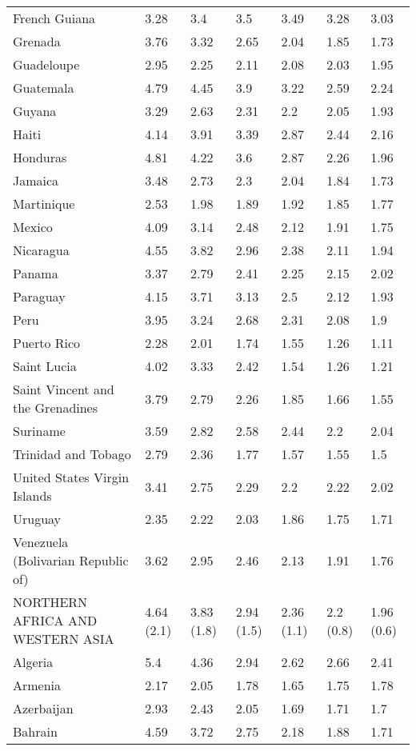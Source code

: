 \begin{longtable}[t]{lllllll}
French Guiana & 3.28 & 3.4 & 3.5 & 3.49 & 3.28 & 3.03\\
Grenada & 3.76 & 3.32 & 2.65 & 2.04 & 1.85 & 1.73\\
Guadeloupe & 2.95 & 2.25 & 2.11 & 2.08 & 2.03 & 1.95\\
Guatemala & 4.79 & 4.45 & 3.9 & 3.22 & 2.59 & 2.24\\
Guyana & 3.29 & 2.63 & 2.31 & 2.2 & 2.05 & 1.93\\
Haiti & 4.14 & 3.91 & 3.39 & 2.87 & 2.44 & 2.16\\
Honduras & 4.81 & 4.22 & 3.6 & 2.87 & 2.26 & 1.96\\
Jamaica & 3.48 & 2.73 & 2.3 & 2.04 & 1.84 & 1.73\\
Martinique & 2.53 & 1.98 & 1.89 & 1.92 & 1.85 & 1.77\\
Mexico & 4.09 & 3.14 & 2.48 & 2.12 & 1.91 & 1.75\\
Nicaragua & 4.55 & 3.82 & 2.96 & 2.38 & 2.11 & 1.94\\
Panama & 3.37 & 2.79 & 2.41 & 2.25 & 2.15 & 2.02\\
Paraguay & 4.15 & 3.71 & 3.13 & 2.5 & 2.12 & 1.93\\
Peru & 3.95 & 3.24 & 2.68 & 2.31 & 2.08 & 1.9\\
Puerto Rico & 2.28 & 2.01 & 1.74 & 1.55 & 1.26 & 1.11\\
Saint Lucia & 4.02 & 3.33 & 2.42 & 1.54 & 1.26 & 1.21\\
Saint Vincent and the Grenadines & 3.79 & 2.79 & 2.26 & 1.85 & 1.66 & 1.55\\
Suriname & 3.59 & 2.82 & 2.58 & 2.44 & 2.2 & 2.04\\
Trinidad and Tobago & 2.79 & 2.36 & 1.77 & 1.57 & 1.55 & 1.5\\
United States Virgin Islands & 3.41 & 2.75 & 2.29 & 2.2 & 2.22 & 2.02\\
Uruguay & 2.35 & 2.22 & 2.03 & 1.86 & 1.75 & 1.71\\
Venezuela (Bolivarian Republic of) & 3.62 & 2.95 & 2.46 & 2.13 & 1.91 & 1.76\\
NORTHERN AFRICA AND WESTERN ASIA & 4.64 (2.1) & 3.83 (1.8) & 2.94 (1.5) & 2.36 (1.1) & 2.2 (0.8) & 1.96 (0.6)\\
Algeria & 5.4 & 4.36 & 2.94 & 2.62 & 2.66 & 2.41\\
Armenia & 2.17 & 2.05 & 1.78 & 1.65 & 1.75 & 1.78\\
Azerbaijan & 2.93 & 2.43 & 2.05 & 1.69 & 1.71 & 1.7\\
Bahrain & 4.59 & 3.72 & 2.75 & 2.18 & 1.88 & 1.71\\

\end{longtable}

